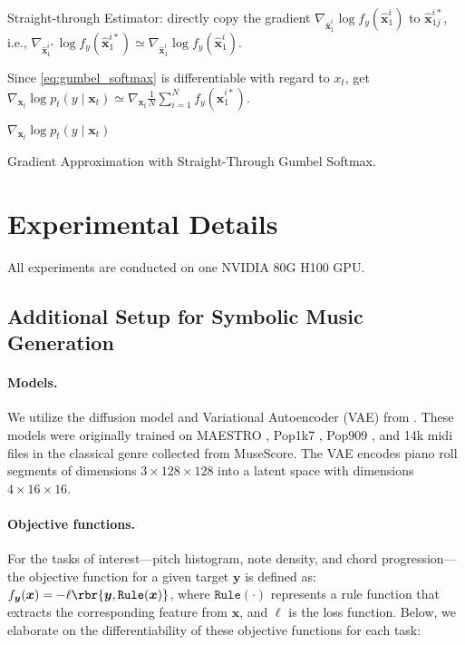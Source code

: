 \begin{module}[htb]
\begin{algorithmic}[1]
\STATE Straight-through Estimator: 
directly copy the gradient $\nabla_{\hat{\boldsymbol{x}}_1^i} \log f_y( \hat{\boldsymbol{x}}_1^i)$ to $\hat{\boldsymbol{x}}_{1j}^{i*}$, i.e., 
$\nabla_{\hat{\boldsymbol{x}}_1^{i*}} \log f_y( \hat{\boldsymbol{x}}_1^{i*}) \simeq \nabla_{\hat{\boldsymbol{x}}_1^i} \log f_y( \hat{\boldsymbol{x}}_1^i)$.

\STATE Since \cref{eq:gumbel_softmax} is differentiable with regard to $x_t$, 
get $\nabla_{\boldsymbol{x}_t} \log p_t(y\mid \boldsymbol{x}_t) \simeq \nabla_{\boldsymbol{x}_t}\frac{1}{N}\sum_{i=1}^N f_y({\hat{\boldsymbol{x}}_1^{i*}})$.

 {$\nabla_{\boldsymbol{x}_t} \log p_t(y\mid \boldsymbol{x}_t)$}

\end{algorithmic}
\caption{Gradient Approximation with Straight-Through Gumbel Softmax.}
\label{alg: gumbel_softmax}
\end{module}



\section{Experimental Details}
All experiments are conducted on one NVIDIA 80G H100 GPU.



\subsection{Additional Setup for Symbolic Music Generation}\label{app:exp detail music}

\paragraph{Models.} We utilize the diffusion model and Variational Autoencoder (VAE) from \cite{huang2024symbolic}. These models were originally trained on MAESTRO \cite{hawthorne2018enabling}, Pop1k7 \cite{hsiao2021compound}, Pop909 \cite{wang2020pop909}, and 14k midi files in the classical genre collected from MuseScore. 
The VAE encodes piano roll segments of dimensions $3 \times 128 \times 128$ into a latent space with dimensions $4 \times 16 \times 16$.


\paragraph{Objective functions.} For the tasks of interest—pitch histogram, note density, and chord progression—the objective function for a given target $\boldsymbol{y}$ is defined as: $f_{\boldsymbol{y}}(\boldsymbol{x}) = - \ell\rbr{\boldsymbol{y}, \texttt{Rule}(\boldsymbol{x})}$, where $\texttt{Rule}(\cdot)$ represents a rule function that extracts the corresponding feature from $\boldsymbol{x}$, and $\ell$ is the loss function. Below, we elaborate on the differentiability of these objective functions for each task:

